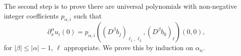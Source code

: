 \documentclass[12pt]{article}
\begin{document}
The second step is to prove there are universal polynomials with non-negative integer coefficients $p_{\alpha, i}$ such that
\[
\partial^\alpha_x u_i(0) = p_{\alpha, i} ((D^\beta b_{j})_{\ell_1, \ell_2}, (D^\beta b_0)_\ell)(0, 0),
\]
for $|\beta| \leq |\alpha| - 1$, $\ell$ appropriate. We prove this by induction on $\alpha_n$.


\newpage

\printindex
\end{document}
